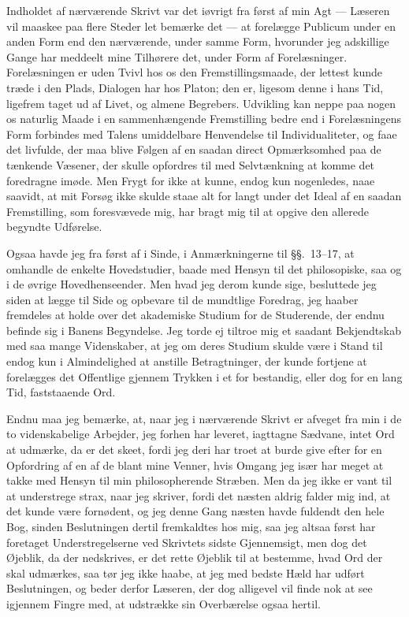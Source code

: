 \documentclass[12pt,a4paper]{book}
\newcommand{\opage}[1]{\marginnote{\footnotesize\textit{[#1]}}}
\begin{document}
Indholdet af nærværende Skrivt var det iøvrigt fra først af min Agt ---
Læseren vil maaskee paa flere Steder let bemærke det --- at forelægge
Publicum under en anden Form end den nærværende, under samme Form, hvorunder
jeg adskillige Gange har meddeelt mine Tilhørere det, under Form af
Forelæsninger. Forelæsningen er uden Tvivl hos os den Fremstillingsmaade, der
lettest kunde træde i den Plads, Dialogen har hos Platon; den er, ligesom
denne i hans Tid, ligefrem taget ud af Livet, og almene Begrebers. Udvikling
kan neppe paa nogen os naturlig Maade i en sammenhængende Fremstilling bedre
end i Forelæsningens Form forbindes med Talens umiddelbare Henvendelse til
Individualiteter, og faae det livfulde, der maa blive Følgen af en saadan
direct Opmærksomhed paa de tænkende Væsener, der skulle opfordres til med
Selvtænkning at komme det foredragne imøde. Men Frygt for ikke at kunne,
endog kun nogenledes, naae saavidt, at mit Forsøg ikke skulde staae alt for
langt under det \opage{XI} Ideal af en saadan Fremstilling, som foresvævede mig, har
bragt mig til at opgive den allerede begyndte Udførelse.

Ogsaa havde jeg fra først af i Sinde, i Anmærkningerne til §§.~13--17, at
omhandle de enkelte Hovedstudier, baade med Hensyn til det philosopiske, saa
og i de øvrige Hovedhenseender. Men hvad jeg derom kunde sige, besluttede jeg
siden at lægge til Side og opbevare til de mundtlige Foredrag, jeg haaber
fremdeles at holde over det akademiske Studium for de Studerende, der endnu
befinde sig i Banens Begyndelse. Jeg torde ej tiltroe mig et saadant
Bekjendtskab med saa mange Videnskaber, at jeg om deres Studium skulde være i
Stand til endog kun i Almindelighed at anstille Betragtninger, der kunde
fortjene at forelægges det Offentlige gjennem Trykken i et for bestandig,
eller dog for en lang Tid, faststaaende Ord.

Endnu maa jeg bemærke, at, naar jeg i nærværende Skrivt er afveget fra min i
de to videnskabelige Arbejder, jeg forhen har leveret, iagttagne Sædvane,
intet Ord at udmærke, da er det skeet, \opage{XII} fordi jeg deri har troet at burde give
efter for en Opfordring af en af de blant mine Venner, hvis Omgang jeg især
har meget at takke med Hensyn til min philosopherende Stræben. Men da jeg
ikke er vant til at understrege strax, naar jeg skriver, fordi det næsten
aldrig falder mig ind, at det kunde være fornødent, og jeg denne Gang næsten
havde fuldendt den hele Bog, sinden Beslutningen dertil fremkaldtes hos mig,%
 saa jeg altsaa først har foretaget Understregelserne ved Skrivtets sidste
Gjennemsigt, men dog det Øjeblik, da der nedskrives, er det rette Øjeblik til
at bestemme, hvad Ord der skal udmærkes, saa tør jeg ikke haabe, at jeg med
bedste Hæld har udført Beslutningen, og beder derfor Læseren, der dog
alligevel vil finde nok at see igjennem Fingre med, at udstrække sin
Overbærelse ogsaa hertil.
\end{document}
